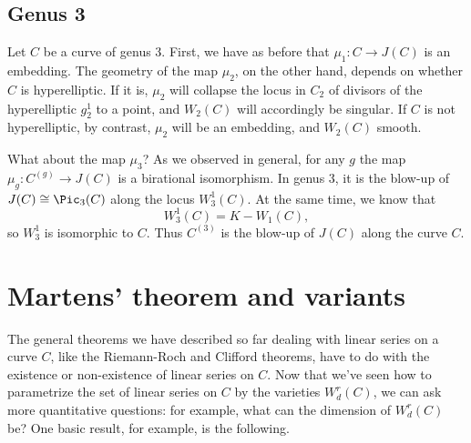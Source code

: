 \subsection{Genus 3}

Let $C$ be a curve of genus 3. First, we have as before that $\mu_1 : C \to J(C)$ is an embedding. The geometry of the map $\mu_2$, on the other hand, depends on whether  $C$ is hyperelliptic. If it is, $\mu_2$ will collapse the locus in $C_2$ of divisors of the hyperelliptic $g^1_2$ to a point, and $W_2(C)$ will accordingly be singular. If $C$ is not hyperelliptic, by contrast, $\mu_2$ will be an embedding, and $W_2(C)$ smooth.

What about the map $\mu_3$? As we observed in general, for any $g$ the map $\mu_g : C^{(g)} \to J(C)$ is a birational isomorphism. In genus 3, it is the blow-up of $J(C) \cong \Pic_3(C)$ along the locus $W^1_3(C)$. At the same time, we know that
$$
W^1_3(C) = K - W_1(C),
$$
so $W^1_3$ is isomorphic to $C$. Thus $C^{(3)}$ is the blow-up of $J(C)$ along the curve $C$.


%
%
%

\section{Martens' theorem and variants}

The general theorems we have described so far dealing with linear series on a curve $C$, like the Riemann-Roch and Clifford theorems, have to do with the existence or non-existence of linear series on $C$. Now that we've seen how to parametrize the set of linear series on $C$ by the varieties $W^r_d(C)$, we can ask more quantitative questions: for example, what can the dimension of $W^r_d(C)$ be? One basic result, for example, is the following.

